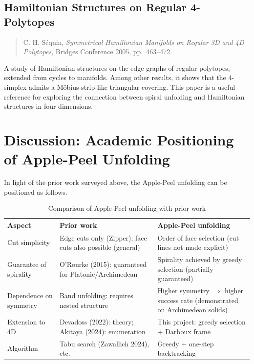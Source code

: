 \documentclass[a4paper,11pt]{article}
\begin{document}
\subsection{Hamiltonian Structures on Regular 4-Polytopes}

\begin{quotation}\noindent
  C. H. S\'{e}quin,
  \textit{Symmetrical Hamiltonian Manifolds on Regular 3D and 4D Polytopes},
  Bridges Conference 2005, pp.~463--472.
\end{quotation}

A study of Hamiltonian structures on the edge graphs of regular polytopes,
extended from cycles to manifolds.
Among other results, it shows that the 4-simplex admits a M\"{o}bius-strip-like triangular
covering.
This paper is a useful reference for exploring the connection between spiral unfolding and
Hamiltonian structures in four dimensions.

\section{Discussion: Academic Positioning of Apple-Peel Unfolding}

In light of the prior work surveyed above, the Apple-Peel unfolding can be positioned as follows.

\begin{table}[h]
\centering
\caption{Comparison of Apple-Peel unfolding with prior work}
\label{tab:comparison}
\renewcommand{\arraystretch}{1.3}
\begin{tabular}{lp{5.2cm}p{5.8cm}}
\toprule
Aspect & Prior work & Apple-Peel unfolding \\
\midrule
Cut simplicity
  & Edge cuts only (Zipper); face cuts also possible (general)
  & Order of face selection (cut lines not made explicit) \\
Guarantee of spirality
  & O'Rourke (2015): guaranteed for Platonic/Archimedean
  & Spirality achieved by greedy selection (partially guaranteed) \\
Dependence on symmetry
  & Band unfolding: requires nested structure
  & Higher symmetry $\Rightarrow$ higher success rate (demonstrated on Archimedean solids) \\
Extension to 4D
  & Devadoss (2022): theory; Akitaya (2024): enumeration
  & This project: greedy selection + Darboux frame \\
Algorithm
  & Tabu search (Zawallich 2024), etc.
  & Greedy + one-step backtracking \\
\bottomrule
\end{tabular}
\end{table}
\end{document}
